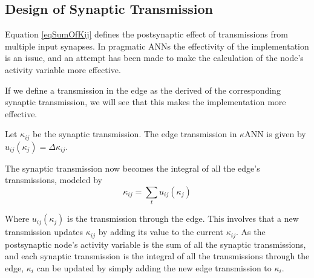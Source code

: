 		

		\subsection{Design of Synaptic Transmission}
			\label{ssecSynInputToANodeKANN}
			Equation \eqref{eqSumOfKij} defines the postsynaptic effect of transmissions from multiple input synapses.
			In pragmatic ANNs the effectivity of the implementation is an issue, and an attempt has been made to make the calculation of the node's activity variable more effective.
			
			If we define a transmission in the edge as the derived of the corresponding synaptic transmission, we will see that this makes the implementation more effective.
			\begin{mydef}
				Let $\kappa_{ij}$ be the synaptic transmission. The edge transmission in $\kappa$ANN is given by $u_{ij}(\kappa_j) = \Delta \kappa_{ij}$.
			\end{mydef}
			The synaptic transmission now becomes the integral of all the edge's transmissions, modeled by %
			\begin{equation}
				\kappa_{ij} = \sum_t{u_{ij}(\kappa_j)}
				\label{eqSynapticTransmissionAsSumOfEdgeTransmissions}
			\end{equation}
			
			Where $u_{ij}(\kappa_j)$ is the transmission through the edge.
			This involves that a new transmission updates $\kappa_{ij}$ by adding its value to the current $\kappa_{ij}$.
			As the postsynaptic node's activity variable is the sum of all the synaptic transmissions, and each synaptic transmission is the integral of all the transmissions through the edge, 
				$\kappa_i$ can be updated by simply adding the new edge transmission to $\kappa_i$.

